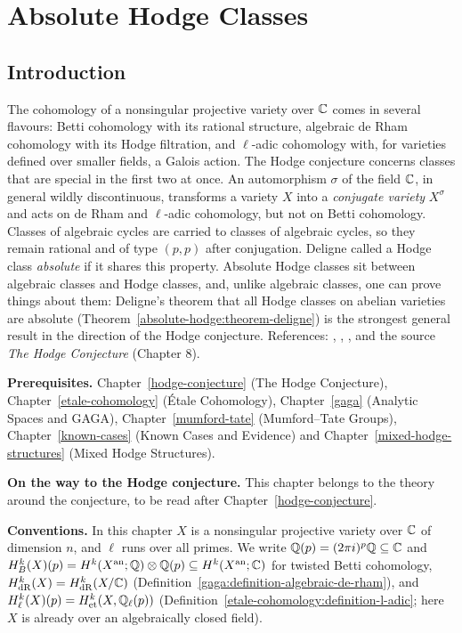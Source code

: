 \chapter{Absolute Hodge Classes}\label{absolute-hodge}

\section{Introduction}\label{absolute-hodge:section-introduction}

The cohomology of a nonsingular projective variety over $\mathbb{C}$ comes in several flavours: Betti cohomology with its rational structure, algebraic de Rham cohomology with its Hodge filtration, and
$\ell$-adic cohomology with, for varieties defined over smaller fields, a Galois action. The Hodge conjecture concerns classes that are special in the first two at once. An automorphism
$\sigma$ of the field $\mathbb{C}$, in general wildly discontinuous, transforms a variety $X$ into a \emph{conjugate variety} $X^\sigma$ and acts on de Rham and $\ell$-adic cohomology, but not on Betti
cohomology. Classes of algebraic cycles are carried to classes of algebraic cycles, so they remain rational and of type $(p,p)$ after conjugation. Deligne called a Hodge class \emph{absolute} if it
shares this property. Absolute Hodge classes sit between algebraic classes and Hodge classes, and, unlike algebraic classes, one can prove things about them: Deligne's
theorem that all Hodge classes on abelian varieties are absolute (Theorem~\ref{absolute-hodge:theorem-deligne}) is the strongest general result in the direction of the Hodge conjecture.
References: \cite{deligne-abelian}, \cite{charles-schnell}, \cite{voisin-2007}, and the source \emph{The Hodge Conjecture} (Chapter 8).

\noindent\textbf{Prerequisites.} Chapter~\ref{hodge-conjecture} (The Hodge Conjecture), Chapter~\ref{etale-cohomology} (\'Etale Cohomology), Chapter~\ref{gaga} (Analytic Spaces and GAGA),
Chapter~\ref{mumford-tate} (Mumford--Tate Groups), Chapter~\ref{known-cases} (Known Cases and Evidence) and Chapter~\ref{mixed-hodge-structures} (Mixed Hodge Structures).

\noindent\textbf{On the way to the Hodge conjecture.} This chapter belongs to the theory around the conjecture, to be read after Chapter~\ref{hodge-conjecture}.

\noindent\textbf{Conventions.} In this chapter $X$ is a nonsingular projective variety over $\mathbb{C}$ of dimension $n$, and $\ell$ runs over all primes. We write
$\mathbb{Q}(p) = (2\pi i)^p\mathbb{Q} \subseteq \mathbb{C}$ and $H^k_B(X)(p) = H^k(X^{\mathrm{an}}; \mathbb{Q}) \otimes \mathbb{Q}(p) \subseteq H^k(X^{\mathrm{an}}; \mathbb{C})$ for twisted Betti cohomology, $H^k_{\mathrm{dR}}(X) = H^k_{\mathrm{dR}}(X/\mathbb{C})$
(Definition~\ref{gaga:definition-algebraic-de-rham}), and $H^k_\ell(X)(p) = H^k_{\mathrm{et}}(X, \mathbb{Q}_\ell(p))$ (Definition~\ref{etale-cohomology:definition-l-adic}; here $X$ is already over an algebraically
closed field).

